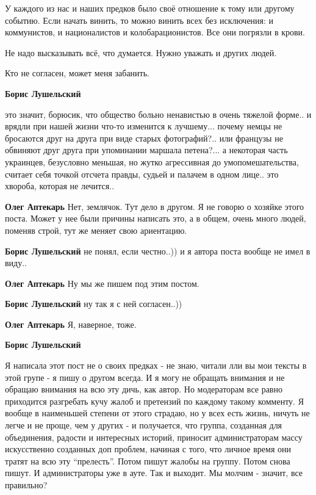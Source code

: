 \begin{itemize}
У каждого из нас и наших предков было своё отношение к тому или другому
событию. Если начать винить, то можно винить всех без исключения: и
коммунистов, и националистов и колобарационистов. Все они погрязли в крови.

Не надо высказывать всё, что думается. Нужно уважать и других людей.

Кто не согласен, может меня забанить.

\begin{itemize} %
\textbf{Борис Лушельский} 

это значит, борюсик, что общество больно ненавистью в очень тяжелой форме.. и
врядли при нашей жизни что-то изменится к лучшему... почему немцы не бросаются
друг на друга при виде старых фотографий?.. или французы не обвиняют друг друга
при упоминании маршала петена?... а некоторая часть украинцев, безусловно
меньшая, но жутко агрессивная до умопомешательства, считает себя точкой
отсчета правды, судьей и палачем в одном лице.. это хвороба, которая не
лечится..

\begin{itemize} %
\textbf{Олег Аптекарь}
Нет, землячок. Тут дело в другом.
Я не говорю о хозяйке этого поста. Может у нее были причины написать это, а в
общем, очень много людей, поменяв строй, тут же меняет свою ариентацию.

\textbf{Борис Лушельский} не понял, если честно..)) и я автора поста вообще не имел в виду..

\textbf{Олег Аптекарь}
Ну мы же пишем под этим постом.

\textbf{Борис Лушельский} ну так я с ней согласен..))

\textbf{Олег Аптекарь}
Я, наверное, тоже.

\textbf{Борис Лушельский} 

Я написала этот пост не о своих предках - не знаю, читали лли вы мои тексты в
этой групе - я пишу о другом всегда. И я могу не обращать внимания и не обращаю
внимания на всю эту дичь, как автор. Но модераторам все равно приходится
разгребать кучу жалоб и претензий по каждому такому комменту. Я вообще в
наименьшей степени от этого страдаю, но у всех есть жизнь, ничуть не легче и не
проще, чем у других - и получается, что группа, созданная для объединения,
радости и интересных историй, приносит администраторам массу искусственно
созданных доп проблем, начиная с того, что личное время они тратят на всю эту
\enquote{прелесть}. Потом пишут жалобы на группу. Потом снова пишут. И администраторы
уже в ауте. Так и выходит. Мы молчим - значит, все правильно?


\end{itemize}
\end{itemize}
\end{itemize}
